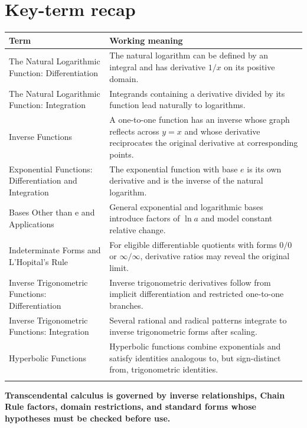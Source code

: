 \documentclass[11pt]{article}
\begin{document}
\section{Key-term recap}
\small
\begin{longtable}{@{}>{\RaggedRight\arraybackslash}p{}>{\RaggedRight\arraybackslash}p{}@{}}
\toprule
\textbf{Term} & \textbf{Working meaning}\\
\midrule\endhead
The Natural Logarithmic Function: Differentiation & The natural logarithm can be defined by an integral and has derivative $1/x$ on its positive domain. \\\addlinespace[2pt]
The Natural Logarithmic Function: Integration & Integrands containing a derivative divided by its function lead naturally to logarithms. \\\addlinespace[2pt]
Inverse Functions & A one-to-one function has an inverse whose graph reflects across $y=x$ and whose derivative reciprocates the original derivative at corresponding points. \\\addlinespace[2pt]
Exponential Functions: Differentiation and Integration & The exponential function with base $e$ is its own derivative and is the inverse of the natural logarithm. \\\addlinespace[2pt]
Bases Other than e and Applications & General exponential and logarithmic bases introduce factors of $\ln a$ and model constant relative change. \\\addlinespace[2pt]
Indeterminate Forms and L'Hopital's Rule & For eligible differentiable quotients with forms $0/0$ or $\infty/\infty$, derivative ratios may reveal the original limit. \\\addlinespace[2pt]
Inverse Trigonometric Functions: Differentiation & Inverse trigonometric derivatives follow from implicit differentiation and restricted one-to-one branches. \\\addlinespace[2pt]
Inverse Trigonometric Functions: Integration & Several rational and radical patterns integrate to inverse trigonometric forms after scaling. \\\addlinespace[2pt]
Hyperbolic Functions & Hyperbolic functions combine exponentials and satisfy identities analogous to, but sign-distinct from, trigonometric identities. \\\addlinespace[2pt]
\bottomrule
\end{longtable}
\normalsize

\enlargethispage{4\baselineskip}
\begin{tcolorbox}[title=One-sentence takeaway,fonttitle=\bfseries,colback=Ink,colframe=Ink,coltext=white,coltitle=white,arc=2mm,boxrule=0pt]
\centering\bfseries Transcendental calculus is governed by inverse relationships, Chain Rule factors, domain restrictions, and standard forms whose hypotheses must be checked before use.
\end{tcolorbox}
\end{document}
